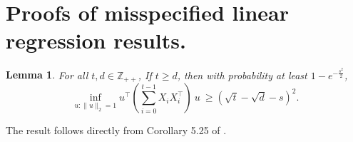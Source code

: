 \documentclass[twoside,11pt]{article}
\renewenvironment{proof}{\par\noindent{\bf Proof\ }}{\hfill\BlackBox\\[2mm]}
\newenvironment{proof}{\par\noindent{\bf Proof\ }}{\hfill\BlackBox\\[2mm]}
\newtheorem{lemma}[theorem]{Lemma}
\begin{document}
\section{Proofs of misspecified linear regression results.}
\label{apdx_sec:misspecification}
\begin{lemma}
    \label{le:rand_matrix_th}
    For all $t, d\in\mathbb{Z}_{++}$, If $t \geq d$, then with probability at least $1 - e^{-\frac{s^2}{2}}$,
    $$\inf_{u: \|u\|_2=1} u^\top \left(\sum_{i=0}^{t-1}X_iX_i^\top\right)\ u\ \geq \left(\sqrt{t}-\sqrt{d} - s\right)^2.$$
\end{lemma}
\begin{proof}
    The result follows directly from Corollary 5.25 of \cite{https://doi.org/10.48550/arxiv.1011.3027}.
\end{proof}
\end{document}
